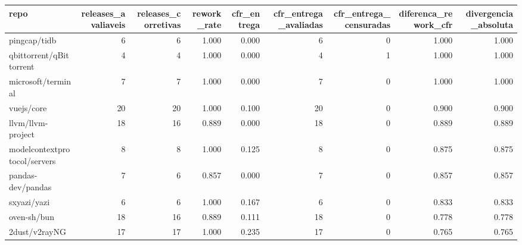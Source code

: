 \begin{tabular}{lrrrrrrrr}
\toprule
repo & releases\_avaliaveis & releases\_corretivas & rework\_rate & cfr\_entrega & cfr\_entrega\_avaliadas & cfr\_entrega\_censuradas & diferenca\_rework\_cfr & divergencia\_absoluta \\
\midrule
pingcap/tidb & 6 & 6 & 1.000 & 0.000 & 6 & 0 & 1.000 & 1.000 \\
qbittorrent/qBittorrent & 4 & 4 & 1.000 & 0.000 & 4 & 1 & 1.000 & 1.000 \\
microsoft/terminal & 7 & 7 & 1.000 & 0.000 & 7 & 0 & 1.000 & 1.000 \\
vuejs/core & 20 & 20 & 1.000 & 0.100 & 20 & 0 & 0.900 & 0.900 \\
llvm/llvm-project & 18 & 16 & 0.889 & 0.000 & 18 & 0 & 0.889 & 0.889 \\
modelcontextprotocol/servers & 8 & 8 & 1.000 & 0.125 & 8 & 0 & 0.875 & 0.875 \\
pandas-dev/pandas & 7 & 6 & 0.857 & 0.000 & 7 & 0 & 0.857 & 0.857 \\
sxyazi/yazi & 6 & 6 & 1.000 & 0.167 & 6 & 0 & 0.833 & 0.833 \\
oven-sh/bun & 18 & 16 & 0.889 & 0.111 & 18 & 0 & 0.778 & 0.778 \\
2dust/v2rayNG & 17 & 17 & 1.000 & 0.235 & 17 & 0 & 0.765 & 0.765 \\
\bottomrule
\end{tabular}
